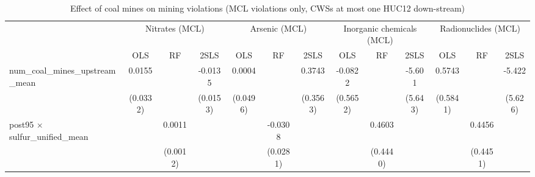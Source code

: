 
\begin{table}[htbp]
   
   \caption{\label{2sls_dwnstrm_minevio_mcl} Effect of coal mines on mining violations (MCL violations only, CWSs at most one HUC12 down-stream)}
   \bigskip
   
   \centering
   
   \begin{adjustbox}{width = \textwidth, center}
      
      
      \begin{tabular}{lcccccccccccc}
         \toprule
         
          & \multicolumn{3}{c}{Nitrates (MCL)} & \multicolumn{3}{c}{Arsenic (MCL)} & \multicolumn{3}{c}{Inorganic chemicals (MCL)} & \multicolumn{3}{c}{Radionuclides (MCL)}\\
         
                                                                             & OLS                  & RF                    & 2SLS                  & OLS                  & RF                    & 2SLS                  & OLS                  & RF            & 2SLS          & OLS           & RF            & 2SLS\\  
         
         \midrule 
         num\_coal\_mines\_upstream\_mean                                    & 0.0155               &                       & -0.0135               & 0.0004               &                       & 0.3743                & -0.0822              &               & -5.601        & 0.5743        &               & -5.422\\   
                                                                             & (0.0332)             &                       & (0.0153)              & (0.0496)             &                       & (0.3563)              & (0.5652)             &               & (5.643)       & (0.5841)      &               & (5.626)\\   
         post95 $\times$ sulfur\_unified\_mean                               &                      & 0.0011                &                       &                      & -0.0308               &                       &                      & 0.4603        &               &               & 0.4456        &   \\   
                                                                             &                      & (0.0012)              &                       &                      & (0.0281)              &                       &                      & (0.4440)      &               &               & (0.4451)      &   \\   
         

\end{tabular}
\end{adjustbox}
\end{table}
